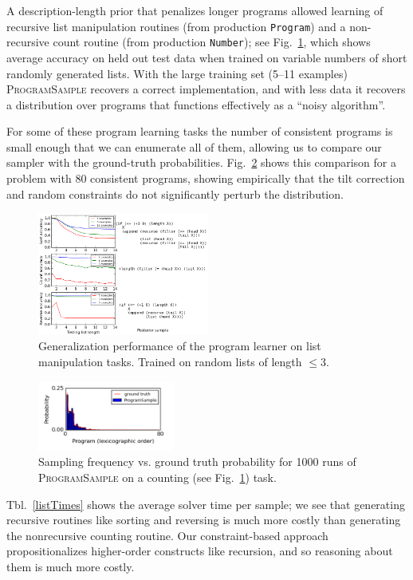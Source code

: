 \documentclass{article}
\newcommand{\theSystem}{\textsc{ProgramSample}}
\begin{document}
A description-length prior that penalizes longer programs allowed learning of recursive list manipulation routines (from production \verb|Program|) and a non-recursive count routine (from production \verb|Number|); see Fig.~\ref{listCurves},
which shows average accuracy on held out test data when trained on variable numbers of short randomly generated lists.
With the large training set (5--11 examples) \theSystem{} recovers a correct implementation,
and with less data it recovers a distribution over programs
that functions effectively as a ``noisy algorithm''.

For some of these program learning tasks the number of consistent programs is small enough that we can enumerate all of them, allowing us to compare our sampler with the ground-truth probabilities.
Fig.~\ref{marginal} shows this comparison for a problem with 80 consistent programs, showing empirically that the tilt correction and random constraints do not significantly perturb the distribution.
\begin{figure}
  \includegraphics[width=0.5\textwidth]{list.png}
  \caption{Generalization performance of the program learner on list manipulation tasks. Trained on random lists of length $\leq 3$.}
  \label{listCurves}
\end{figure}
\begin{figure}
  \includegraphics[width=0.4\textwidth]{probabilityPlot.png}
  \caption{Sampling frequency vs. ground truth probability for 1000 runs of \theSystem{} on a counting (see Fig.~\ref{listCurves}) task.}
  \label{marginal}
  \end{figure}

Tbl.~\ref{listTimes} shows the average solver time per sample; we see that generating recursive routines like sorting and reversing is much more costly than generating the nonrecursive counting routine.
Our constraint-based approach propositionalizes higher-order constructs like recursion, and so reasoning about them is much more costly.
\end{document}
